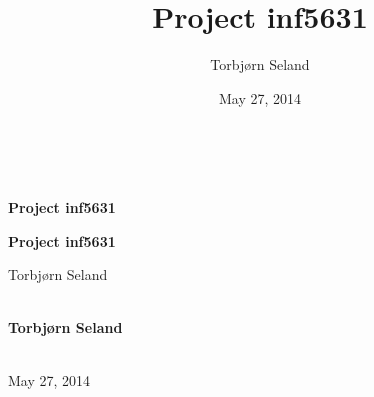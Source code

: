 \documentclass{book}
\begin{document}


\title{Project inf5631 }


\thispagestyle{empty}
\hbox{\ \ }
\vfill
\begin{center}
{\huge{\bfseries{Project inf5631 }}}


\begin{center}
{\LARGE\bf Project inf5631}
\end{center}




\author{Torbjørn Seland}

\vspace{1.3cm}

{\Large\textsf{Torbjørn Seland${}^{}$}}\\ [3mm]

\ \\ [2mm]



\begin{center}
{\bf Torbjørn Seland${}^{}$} \\ [0mm]
\end{center}

\begin{center}
\end{center}





\date{May 27, 2014}
\maketitle


\ \\ [10mm]
{\large\textsf{May 27, 2014}}

\end{center}
\vfill
\clearpage
\end{document}
